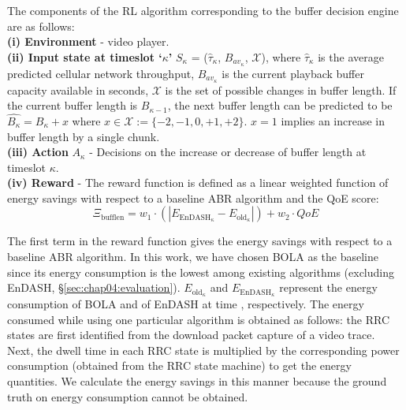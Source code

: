 \indent The components of the \ac{RL} algorithm corresponding to the buffer decision engine are as follows:\\
\noindent \textbf{(i) Environment}   - video player.\\
\noindent \textbf{(ii) Input state at timeslot `$\kappa$'} $S_\kappa$ =  ($\hat{\tau}_{{\kappa}}$, $B_{av_\kappa}$, ${\mathcal{X}}$), where
  $\hat{\tau}_{{\kappa}}$ is the  average predicted cellular network throughput,
 $B_{av_\kappa}$ is the current playback buffer capacity available in seconds,
$\mathcal{X}$ is the set of possible changes in buffer length. If the current buffer length is $B_{\kappa-1}$, the next buffer length can be predicted to be $\hat{B_\kappa}= B_\kappa+x$ where $x\in\mathcal{X}:=\{-2,-1,0,+1,+2\}$. $x=1$ implies an increase in buffer length by a single chunk.\\
\noindent \textbf{(iii) Action} $A_\kappa$ - Decisions on the increase or decrease of buffer length at timeslot $\kappa$. \\
\noindent \textbf{(iv) Reward} - The reward function is defined as a linear weighted function of energy savings with respect to a baseline \ac{ABR} algorithm and the \ac{QoE} score:
    \begin{equation}
    \Xi_{\mathrm{bufflen}} = w_1 \cdot (\left|E_{\mathrm{EnDASH}_\kappa}-E_{\mathrm{old}_\kappa}\right|)+w_2 \cdot QoE
    \end{equation}

\indent The first term in the reward function gives the energy savings with respect to a baseline \ac{ABR} algorithm. In this work, we have chosen BOLA \cite{Spiteri2016} as the baseline since its energy consumption is the lowest among existing algorithms (excluding EnDASH, \S{\ref{sec:chap04:evaluation}}).  $E_{\mathrm{old}_\kappa}$ and $E_{\mathrm{EnDASH}_\kappa}$ represent the energy consumption of BOLA and of EnDASH at time \mq{\kappa}, respectively. The energy consumed while using one particular algorithm is obtained as follows:  the \ac{RRC} states are first identified from the download packet capture of a video trace. Next, the dwell time in each \ac{RRC} state is multiplied by the corresponding power consumption (obtained from the \ac{RRC} state machine) to get the energy quantities. We calculate the energy savings in this manner because the ground truth on energy consumption cannot be obtained.

